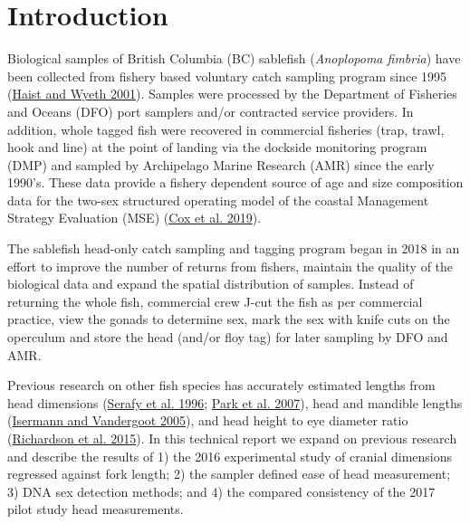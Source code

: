 \documentclass[12pt]{article}\usepackage[]{graphicx}\usepackage[]{color}
\begin{document}

\frontmatter


\renewcommand{\headrulewidth}{0.5pt}  %
\renewcommand{\footrulewidth}{0.5pt}  %

\newcommand{\lt}{\ensuremath <}
\newcommand{\gt}{\ensuremath >}

\newlength{\cslhangindent}
\setlength{\cslhangindent}{1.5em}
\newenvironment{cslreferences}%
  {}%
  {\par}

\hypertarget{introduction}{%
\section{Introduction}\label{introduction}}

Biological samples of British Columbia (BC) sablefish (\emph{Anoplopoma fimbria}) have been collected from fishery based voluntary catch sampling program since 1995 (\protect\hyperlink{ref-Haist2001}{Haist and Wyeth 2001}). Samples were processed by the Department of Fisheries and Oceans (DFO) port samplers and/or contracted service providers. In addition, whole tagged fish were recovered in commercial fisheries (trap, trawl, hook and line) at the point of landing via the dockside monitoring program (DMP) and sampled by Archipelago Marine Research (AMR) since the early 1990's. These data provide a fishery dependent source of age and size composition data for the two-sex structured operating model of the coastal Management Strategy Evaluation (MSE) (\protect\hyperlink{ref-Cox2019}{Cox et al. 2019}).

The sablefish head-only catch sampling and tagging program began in 2018 in an effort to improve the number of returns from fishers, maintain the quality of the biological data and expand the spatial distribution of samples. Instead of returning the whole fish, commercial crew J-cut the fish as per commercial practice, view the gonads to determine sex, mark the sex with knife cuts on the operculum and store the head (and/or floy tag) for later sampling by DFO and AMR.

Previous research on other fish species has accurately estimated lengths from head dimensions (\protect\hyperlink{ref-Serafy1996}{Serafy et al. 1996}; \protect\hyperlink{ref-Park2007}{Park et al. 2007}), head and mandible lengths (\protect\hyperlink{ref-Isermann2005}{Isermann and Vandergoot 2005}), and head height to eye diameter ratio (\protect\hyperlink{ref-Richardson2015}{Richardson et al. 2015}). In this technical report we expand on previous research and describe the results of 1) the 2016 experimental study of cranial dimensions regressed against fork length; 2) the sampler defined ease of head measurement; 3) DNA sex detection methods; and 4) the compared consistency of the 2017 pilot study head measurements.
\end{document}

